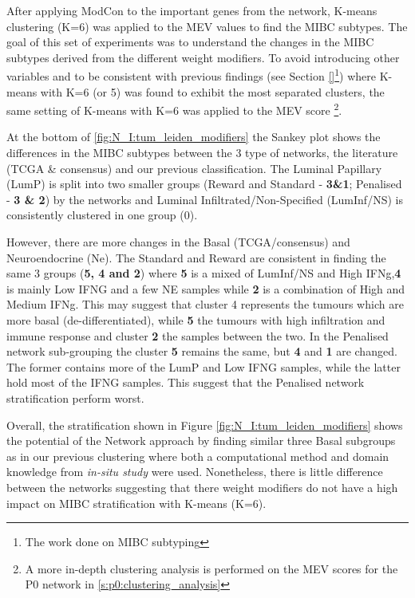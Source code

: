 After applying ModCon to the important genes from the network, K-means clustering (K=6) was applied to the MEV values to find the MIBC subtypes. The goal of this set of experiments was to understand the changes in the MIBC subtypes derived from the different weight modifiers. To avoid introducing other variables and to be consistent with previous findings (see Section \ref{}\footnote{The work done on MIBC subtyping}) where K-means with K=6 (or 5) was found to exhibit the most separated clusters, the same setting of K-means with K=6 was applied to the MEV score \footnote{A more in-depth clustering analysis is performed on the MEV scores for the P0 network in \cref{s:p0:clustering_analysis}}.


At the bottom of \cref{fig:N_I:tum_leiden_modifiers} the Sankey plot shows the differences in the MIBC subtypes between the 3 type of networks, the literature (TCGA \& consensus) and our previous classification. The Luminal Papillary (LumP) is split into two smaller groups (Reward and Standard - \textbf{3\&1}; Penalised - \textbf{3 \& 2}) by the networks and Luminal Infiltrated/Non-Specified (LumInf/NS) is consistently clustered in one group (0). 

However, there are more changes in the Basal (TCGA/consensus) and Neuroendocrine (Ne). The Standard and Reward are consistent in finding the same 3 groups (\textbf{5, 4 and 2}) where \textbf{5} is a mixed of LumInf/NS and High IFNg,\textbf{4} is mainly Low IFNG and a few NE samples while \textbf{2} is a combination of High and Medium IFNg. This may suggest that cluster 4 represents the tumours which are more basal (de-differentiated), while \textbf{5} the tumours with high infiltration and immune response and cluster \textbf{2} the samples between the two. In the Penalised network sub-grouping the cluster \textbf{5} remains the same, but \textbf{4} and \textbf{1} are changed. The former contains more of the LumP and Low IFNG samples, while the latter hold most of the IFNG samples. This suggest that the Penalised network stratification perform worst.

Overall, the stratification shown in Figure \ref{fig:N_I:tum_leiden_modifiers} shows the potential of the Network approach by finding similar three Basal subgroups as in our previous clustering where both a computational method and domain knowledge from \textit{in-situ study} \citet{Baker2022-bj} were used. Nonetheless, there is little difference between the networks suggesting that there weight modifiers do not have a high impact on MIBC stratification with K-means (K=6).

